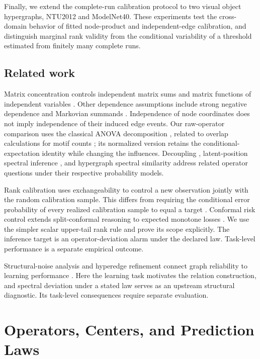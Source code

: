 Finally, we extend the complete-run calibration protocol to two visual
object hypergraphs, NTU2012 and ModelNet40. These experiments test the
cross-domain behavior of fitted node-product and independent-edge
calibration, and distinguish marginal rank validity from the
conditional variability of a threshold estimated from finitely many
complete runs.

\subsection{Related work}
Matrix concentration controls independent matrix sums
\cite{tropp2012user} and matrix functions of independent variables
\cite{paulin2016efronstein}. Other dependence assumptions include
strong negative dependence and Markovian summands
\cite{amparore2025dependent,geuchen2024matrix}. Independence of node
coordinates does not imply independence of their induced edge events.
Our raw-operator comparison uses the classical ANOVA decomposition
\cite{hoeffding1948class}, related to overlap calculations for motif
counts \cite{matias2006motifs}; its normalized version retains the
conditional-expectation identity while changing the influences.
Decoupling \cite{delapena1999decoupling}, latent-position spectral
inference \cite{athreya2018statistical}, and hypergraph spectral
similarity \cite{hayhoe24spectral} address related operator questions
under their respective probability models.

Rank calibration uses exchangeability to control a new observation
jointly with the random calibration sample. This differs from requiring
the conditional error probability of every realized calibration sample
to equal a target \cite{vovk2012conditional}. Conformal risk control
extends split-conformal reasoning to expected monotone losses
\cite{angelopoulos2024crc}. We use the simpler scalar upper-tail rank
rule and prove its scope explicitly. The inference target is an
operator-deviation alarm under the declared law. Task-level performance
is a separate empirical outcome.

Structural-noise analysis and hyperedge refinement connect graph
reliability to learning performance
\cite{dong23structural,huang26trustworthy}. Here the learning task
motivates the relation construction, and spectral deviation under a
stated law serves as an upstream structural diagnostic. Its task-level
consequences require separate evaluation.

\section{Operators, Centers, and Prediction Laws}\label{sec:norm-model}

